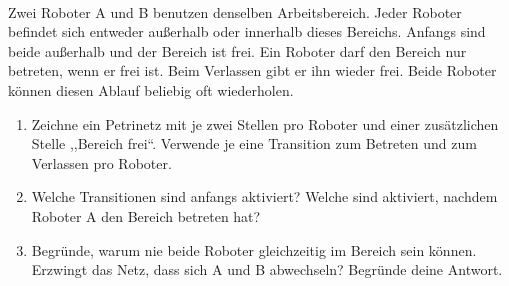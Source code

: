 \\
Zwei Roboter A und B benutzen denselben Arbeitsbereich. Jeder Roboter befindet
sich entweder außerhalb oder innerhalb dieses Bereichs. Anfangs sind beide
außerhalb und der Bereich ist frei. Ein Roboter darf den Bereich nur betreten,
wenn er frei ist. Beim Verlassen gibt er ihn wieder frei. Beide Roboter können
diesen Ablauf beliebig oft wiederholen.
\begin{enumerate}
  \item Zeichne ein Petrinetz mit je zwei Stellen pro Roboter und einer
        zusätzlichen Stelle ,,Bereich frei``. Verwende je eine Transition
        zum Betreten und zum Verlassen pro Roboter.
  \item Welche Transitionen sind anfangs aktiviert? Welche sind aktiviert,
        nachdem Roboter A den Bereich betreten hat?
  \item Begründe, warum nie beide Roboter gleichzeitig im Bereich sein können.
        Erzwingt das Netz, dass sich A und B abwechseln? Begründe deine Antwort.
\end{enumerate}

